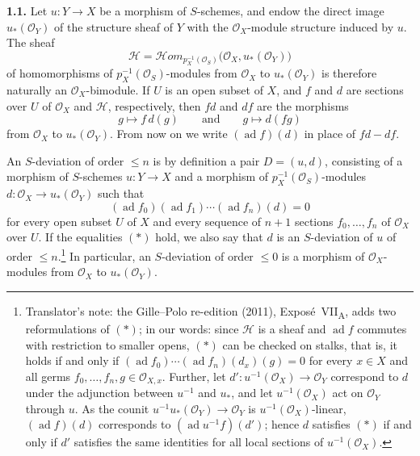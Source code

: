 \medskip
\noindent\textbf{1.1.}
\label{sga3:VIIA:1.1}
Let \(u:Y\to X\) be a morphism of \(S\)-schemes, and endow the direct
image \(u_*(\mathcal O_Y)\) of the structure sheaf of \(Y\) with the
\(\mathcal O_X\)-module structure induced by \(u\). The sheaf
\[
  \mathcal H=
  \mathcal Hom_{p_X^{-1}(\mathcal O_S)}
    \bigl(\mathcal O_X,u_*(\mathcal O_Y)\bigr)
\]
of homomorphisms of \(p_X^{-1}(\mathcal O_S)\)-modules from
\(\mathcal O_X\) to \(u_*(\mathcal O_Y)\) is therefore naturally an
\(\mathcal O_X\)-bimodule. If \(U\) is an open subset of \(X\), and
\(f\) and \(d\) are sections over \(U\) of \(\mathcal O_X\) and
\(\mathcal H\), respectively, then \(fd\) and \(df\) are the morphisms
\[
  g\longmapsto f\,d(g)
  \qquad\text{and}\qquad
  g\longmapsto d(fg)
\]
from \(\mathcal O_X\) to \(u_*(\mathcal O_Y)\). From now on we write
\((\operatorname{ad}f)(d)\) in place of \(fd-df\).

\label{sga3:VIIA:1.1.1}
An \(S\)-deviation of order \(\leq n\) is by definition a pair
\(D=(u,d)\), consisting of a morphism of \(S\)-schemes \(u:Y\to X\)
and a morphism of \(p_X^{-1}(\mathcal O_S)\)-modules
\(d:\mathcal O_X\to u_*(\mathcal O_Y)\) such that
\begin{equation}
  (\operatorname{ad}f_0)(\operatorname{ad}f_1)\cdots
  (\operatorname{ad}f_n)(d)=0
  \tag{\(\ast\)}
\end{equation}
for every open subset \(U\) of \(X\) and every sequence of \(n+1\)
sections \(f_0,\ldots,f_n\) of \(\mathcal O_X\) over \(U\). If the
equalities \((\ast)\) hold, we also say that \(d\) is an
\(S\)-deviation of \(u\) of order \(\leq n\).\footnote{Translator's
note: the Gille--Polo re-edition (2011), Expos\'e~VII\textsubscript{A},
adds two reformulations of \((\ast)\); in our words: since
\(\mathcal H\) is a sheaf and \(\operatorname{ad}f\) commutes with
restriction to smaller opens, \((\ast)\) can be checked on stalks, that
is, it holds if and only if
\((\operatorname{ad}f_0)\cdots(\operatorname{ad}f_n)(d_x)(g)=0\) for
every \(x\in X\) and all germs \(f_0,\ldots,f_n,g\in\mathcal O_{X,x}\).
Further, let \(d':u^{-1}(\mathcal O_X)\to\mathcal O_Y\) correspond to
\(d\) under the adjunction between \(u^{-1}\) and \(u_*\), and let
\(u^{-1}(\mathcal O_X)\) act on \(\mathcal O_Y\) through \(u\). As the
counit \(u^{-1}u_*(\mathcal O_Y)\to\mathcal O_Y\) is
\(u^{-1}(\mathcal O_X)\)-linear, \((\operatorname{ad}f)(d)\) corresponds
to \((\operatorname{ad}u^{-1}f)(d')\); hence \(d\) satisfies \((\ast)\)
if and only if \(d'\) satisfies the same identities for all local
sections of \(u^{-1}(\mathcal O_X)\).} In particular, an
\(S\)-deviation of order \(\leq0\) is a morphism of
\(\mathcal O_X\)-modules from \(\mathcal O_X\) to
\(u_*(\mathcal O_Y)\).

